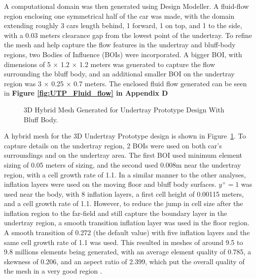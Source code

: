  \noindent A computational domain was then generated using Design Modeller. A fluid-flow region enclosing one symmetrical half of the car was made, with the domain extending roughly 3 cars length behind, 1 forward, 1 on top, and 1 to the side, with a 0.03 meters clearance gap from the lowest point of the undertray. To refine the mesh and help capture the flow features in the undertray and bluff-body regions, two Bodies of Influence (BOIs) were incorporated. A bigger BOI, with dimensions of 5 $\times$ 1.2 $\times$ 1.2 meters was generated to capture the flow surrounding the bluff body, and an additional smaller BOI on the undertray region was 3 $\times$ 0.25 $\times$ 0.7 meters. The enclosed fluid flow generated can be seen in \textbf{Figure \ref{fig:UTP_Fluid_flow} in Appendix D}
 
 \begin{figure}[!htb] 
    \centering
    \noindent{}
    \caption{3D Hybrid Mesh Generated for Undertray Prototype Design With Bluff Body.}
    \label{fig:3D_UT_MESH}
\end{figure}

\noindent A hybrid mesh for the 3D Undertray Prototype design is shown in Figure~\ref{fig:3D_UT_MESH}. To capture details on the undertray region, 2 BOIs were used on both car's surroundings and on the undertray area. The first BOI used minimum element sizing of 0.05 meters of sizing, and the second used 0.008m near the undertray region, with a cell growth rate of 1.1. In a similar manner to the other analyses, inflation layers were used on the moving floor and bluff body surfaces. $y^+ = 1$ was used near the body, with 8 inflation layers, a first cell height of 0.00115 meters, and a cell growth rate of 1.1. However, to reduce the jump in cell size after the inflation region to the far-field and still capture the boundary layer in the undertray region, a smooth transition inflation layer was used in the floor region. A smooth transition of 0.272 (the default value) with five inflation layers and the same cell growth rate of 1.1 was used. This resulted in meshes of around 9.5 to 9.8 millions elements being generated, with an average element quality of 0.785, a skewness of 0.206, and an aspect ratio of 2.399, which put the overall quality of the mesh in a very good region \cite{Ansys2006ModelingFlows}.   

